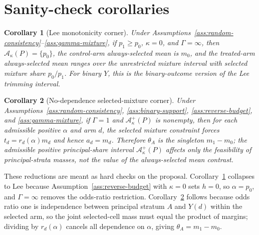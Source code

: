 \documentclass[11pt]{article}
\theoremstyle{definition}
\theoremstyle{plain}
\newtheorem{corollary}{Corollary}
\theoremstyle{remark}
\begin{document}
\section{Sanity-check corollaries}
\begin{corollary}[Lee monotonicity corner]\label{cor:lee-corner}
Under Assumptions~\ref{ass:random-consistency}--\ref{ass:gamma-mixture}, if \(p_1\ge p_0\), \(\kappa=0\), and \(\Gamma=\infty\), then \(\mathcal A_\kappa(P)=\{p_0\}\), the control-arm always-selected mean is \(m_0\), and the treated-arm always-selected mean ranges over the unrestricted mixture interval with selected mixture share \(p_0/p_1\).  For binary \(Y\), this is the binary-outcome version of the Lee trimming interval.
\end{corollary}

\begin{corollary}[No-dependence selected-mixture corner]\label{cor:gamma-one}
Under Assumptions~\ref{ass:random-consistency}, \ref{ass:binary-support}, \ref{ass:reverse-budget}, and \ref{ass:gamma-mixture}, if \(\Gamma=1\) and \(\mathcal A_\kappa^+(P)\) is nonempty, then for each admissible positive \(\alpha\) and arm \(d\), the selected mixture constraint forces \(t_d=r_d(\alpha)m_d\) and hence \(a_d=m_d\).  Therefore \(\theta_A\) is the singleton \(m_1-m_0\); the admissible positive principal-share interval \(\mathcal A_\kappa^+(P)\) affects only the feasibility of principal-strata masses, not the value of the always-selected mean contrast.
\end{corollary}

These reductions are meant as hard checks on the proposal.  Corollary~\ref{cor:lee-corner} collapses to Lee because Assumption~\ref{ass:reverse-budget} with \(\kappa=0\) sets \(h=0\), so \(\alpha=p_0\), and \(\Gamma=\infty\) removes the odds-ratio restriction.  Corollary~\ref{cor:gamma-one} follows because odds ratio one is independence between principal stratum \(A\) and \(Y(d)\) within the selected arm, so the joint selected-cell mass must equal the product of margins; dividing by \(r_d(\alpha)\) cancels all dependence on \(\alpha\), giving \(\theta_A=m_1-m_0\).
\end{document}
